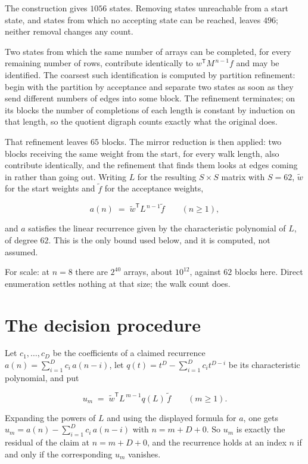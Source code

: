 \documentclass[11pt]{article}
\theoremstyle{definition}
\begin{document}
The construction gives $1056$ states. Removing states unreachable from a start state, and states from which no accepting state can be reached, leaves $496$; neither removal changes any count.

Two states from which the same number of arrays can be completed, for every remaining number of rows, contribute identically to $w^{\mathsf T}M^{\,n-1}f$ and may be identified. The coarsest such identification is computed by partition refinement: begin with the partition by acceptance and separate two states as soon as they send different numbers of edges into some block. The refinement terminates; on its blocks the number of completions of each length is constant by induction on that length, so the quotient digraph counts exactly what the original does.

That refinement leaves $65$ blocks. The mirror reduction is then applied: two blocks receiving the same weight from the start, for every walk length, also contribute identically, and the refinement that finds them looks at edges coming in rather than going out. Writing $L$ for the resulting $S \times S$ matrix with $S = 62$, $\tilde w$ for the start weights and $\tilde f$ for the acceptance weights,

\[a(n) \;=\; \tilde w^{\mathsf T} L^{\,n-1} \tilde f \qquad (n \ge 1),\]

and $a$ satisfies the linear recurrence given by the characteristic polynomial of $L$, of degree $62$. This is the only bound used below, and it is computed, not assumed.

For scale: at $n = 8$ there are $2^{40}$ arrays, about $10^{12}$, against $62$ blocks here. Direct enumeration settles nothing at that size; the walk count does.

\section{The decision procedure}

Let $c_1,\dots,c_D$ be the coefficients of a claimed recurrence $a(n) = \sum_{i=1}^{D} c_i\,a(n-i)$, let $q(t) = t^{D} - \sum_{i=1}^{D} c_i t^{D-i}$ be its characteristic polynomial, and put

\[u_m \;=\; \tilde w^{\mathsf T} L^{\,m-1} q(L)\,\tilde f \qquad (m \ge 1).\]

Expanding the powers of $L$ and using the displayed formula for $a$, one gets $u_m = a(n) - \sum_{i=1}^{D} c_i\,a(n-i)$ with $n = m + D + 0$. So $u_m$ is exactly the residual of the claim at $n = m + D + 0$, and the recurrence holds at an index $n$ if and only if the corresponding $u_m$ vanishes.
\end{document}

